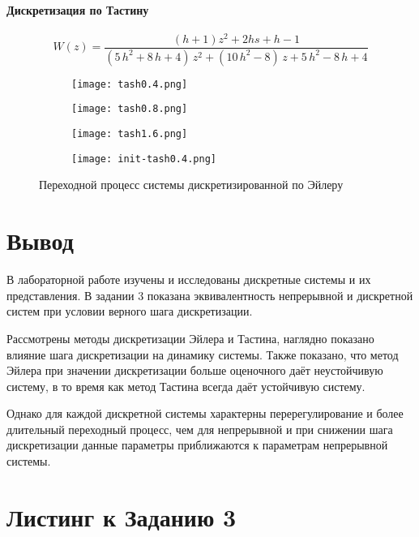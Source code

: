     \paragraph*{Дискретизация по Тастину}
    \begin{equation}
        W(z) = \dfrac{(h+1)z^2 + 2hs + h -1}{\left(5\,h^2+8\,h+4\right)\,z^2+\left(10\,h^2-8\right)\,z+5\,h^2-8\,h+4}
    \end{equation}
    \begin{figure}[H]
        \centering
        \begin{subfigure}{0.49\linewidth}
            \texttt{[image: tash0.4.png]}
        \end{subfigure}
        \begin{subfigure}{0.49\linewidth}
            \texttt{[image: tash0.8.png]}
        \end{subfigure}
        \begin{subfigure}{0.49\linewidth}
            \texttt{[image: tash1.6.png]}
        \end{subfigure}
        \begin{subfigure}{0.49\linewidth}
            \texttt{[image: init-tash0.4.png]}
        \end{subfigure}
        \caption{Переходной процесс системы дискретизированной по Эйлеру}
    \end{figure}

    \section*{Вывод}
    В лабораторной работе изучены и исследованы дискретные системы и их представления.
    В задании 3 показана эквивалентность непрерывной и дискретной систем при условии верного шага дискретизации.

    Рассмотрены методы дискретизации Эйлера и Тастина, наглядно показано влияние шага дискретизации на динамику системы.
    Также показано, что метод Эйлера при значении дискретизации больше оценочного даёт неустойчивую систему, в то время
    как метод Тастина всегда даёт устойчивую систему.

    Однако для каждой дискретной системы характерны перерегулирование и более длительный переходный процесс, чем
    для непрерывной и при снижении шага дискретизации данные параметры приближаются к параметрам непрерывной системы.
    \section*{Листинг к Заданию 3}
    \inputminted[linenos, frame=single, breakanywhere]{octave}{../src/L4T3.m}



